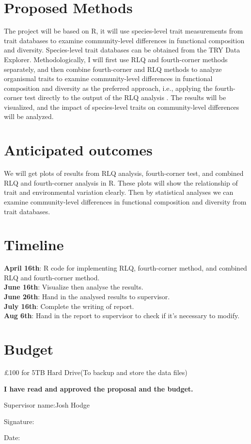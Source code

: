 \documentclass[11pt]{article}
\begin{document}
\section{Proposed Methods}

The project will be based on R, it will use species-level trait measurements from trait databases to examine community-level differences in functional composition and diversity. Species-level trait databases can be obtained from the TRY Data Explorer. Methodologically, I will first use RLQ and fourth-corner methods separately, and then combine fourth-corner and RLQ methods to analyze organismal traits to examine community-level differences in functional composition and diversity as the preferred approach, i.e., applying the fourth-corner test directly to the output of the RLQ analysis \cite{dray2014combining}. The results will be visualized, and the impact of species-level traits on community-level differences will be analyzed.

\section{Anticipated outcomes}

We will get plots of results from RLQ analysis, fourth-corner test, and combined RLQ and fourth-corner analysis in R. These plots will show the relationship of trait and environmental variation clearly. Then by statistical analyses we can examine community-level differences in functional composition and diversity from trait databases.

\section{Timeline}

\textbf{April 16th}:  R code for implementing RLQ, fourth-corner method, and combined RLQ and fourth-corner method. 
\\\textbf{June 16th}:  Visualize then analyse the results. 
\\\textbf{June 26th}:  Hand in the analysed results to supervisor.
\\\textbf{July 16th}:  Complete the writing of report.
\\\textbf{Aug  6th}:  Hand in the report to supervisor to check if it's necessary to modify. 

\section{Budget}

£100 for 5TB Hard Drive(To backup and store the data files)




\newpage

\textbf{I have read and approved the proposal and the budget.}

\vspace{12 pt} Supervisor name:Josh Hodge


\vspace{20 pt} Signature:        

\vspace{12 pt}Date:





\end{document}
